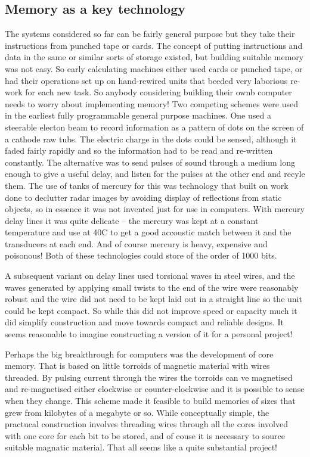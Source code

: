 \subsection{Memory as a key technology}
The systems considered so far can be fairly general purpose but they
take their instructions from punched tape or cards. The concept of
putting instructions and data in the same or similar sorts of storage
existed, but building suitable memory was not easy. So early calculating
machines either used cards or punched tape, or had their operations set up
on  hand-rewired units that beeded very laborious re-work for each
new task. So anybody considering building their ownb computer needs
to worry about implementing memory! Two competing schemes were used in
the earliest fully programmable general purpose machines. One used
a steerable electon beam to record information as a pattern of dots
on the screen of a cathode raw tubs\cite{williamstube}. The electric
charge in the dots could be sensed, although it faded fairly rapidly
and so the information had to be read and re-written constantly. The
alternative was to send pulses of sound through a medium long enough
to give a useful delay, and listen for the pulses at the other end and
recyle them. The use of tanks of mercury for this was technology that
built on work done to declutter radar images by avoiding display of
reflections from static objects, so in essence it was not invented just
for use in computers. With mercury delay lines it was quite delicate --
the mercury was kept at a constant temperature and use at
40\degree C to get a good accoustic match between it and the
transducers at each end.
And of course mercury is heavy, expensive and poisonous! Both of these
technologies could store of the order of 1000 bits.

A subsequent variant on delay lines used torsional waves in steel wires,
and the waves generated by applying small twists to the end of the wire
were reasonably robust and the wire did not need to be kept laid out
in a straight line so the unit could be kept compact. So while this did not
improve speed or capacity much it did simplify construction and move
towards compact and reliable designs. It seems reasonable to imagine
constructing a version of it for a personal project!

Perhaps the big breakthrough for computers was the development of
core memory. That is based on little torroids of magnetic material
with wires threaded. By pulsing current through the wires the torroids can
ve magnetised and re-magnetised either clockwise or counter-clockwise and
it is possible to sense when they change. This scheme made it feasible to
build memories of sizes that grew from kilobytes of a megabyte or so.
While conceptually simple, the practucal construction involves threading
wires through all the cores involved with one core for each bit to be stored,
and of couse it is necessary to source suitable magnatic material. That all
seems like a quite substantial project!

